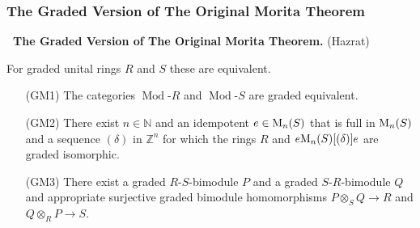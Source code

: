 \documentclass{beamer}
\newcommand{\rmod}[1]{\operatorname{Mod}\text{-}#1}
\newcommand{\grmod}[1]{\operatorname{Gr}\text{-}#1}
\newcommand{\N}{\mathbb{N}}
\begin{document}
\begin{frame}
\frametitle{The Graded Version of The Original Morita Theorem}


\hspace{-.25in} {\bf \  The Graded Version of The Original Morita Theorem.} (Hazrat)     \ 
\bigskip


 
 For graded unital rings $R$ and $S$ these are equivalent.  
 
\begin{itemize} 
\item[(GM1)]  The categories $\rmod{R}$ and $\rmod{S}$  are graded equivalent.
 
 
\item[(GM2)] There exist $n\in \N$ and an  idempotent $e \in {\rm M}_n(S)$ that is full in  ${\rm M}_n(S)$ and a sequence $(\delta)$ in $\mathbb{Z}^n$ for which the rings $R$ and $ e{\rm M}_n(S)[(\delta)]e$ are graded isomorphic.
 

\item[(GM3)] There exist a graded $R$-$S$-bimodule $P$ and a graded $S$-$R$-bimodule $Q$ and appropriate surjective graded bimodule homomorphisms  $P \otimes_S Q \to R$ and $Q\otimes_R P \to S$.  
\end{itemize}

\end{frame}
\end{document}
